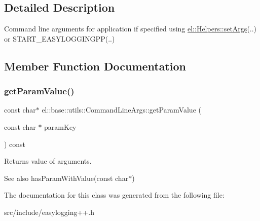\subsection{Detailed Description}
Command line arguments for application if specified using \hyperlink{classel_1_1_helpers_a68748f618a0c2840b96dc12532b09bf0}{el\+::\+Helpers\+::set\+Args}(..) or S\+T\+A\+R\+T\+\_\+\+E\+A\+S\+Y\+L\+O\+G\+G\+I\+N\+G\+PP(..) 

\subsection{Member Function Documentation}
\mbox{\label{classel_1_1base_1_1utils_1_1_command_line_args_ae73303db2f3001842ac094ebd0b28d3f}} 
\subsubsection{\texorpdfstring{get\+Param\+Value()}{getParamValue()}}
{\footnotesize\ttfamily const char$\ast$ el\+::base\+::utils\+::\+Command\+Line\+Args\+::get\+Param\+Value (\begin{DoxyParamCaption}\item[{const char $\ast$}]{param\+Key }\end{DoxyParamCaption}) const\hspace{0.3cm}{\ttfamily [inline]}}



Returns value of arguments. 

\begin{DoxySeeAlso}{See also}
has\+Param\+With\+Value(const char$\ast$) 
\end{DoxySeeAlso}


The documentation for this class was generated from the following file\+:\begin{DoxyCompactItemize}
\item 
src/include/easylogging++.\+h\end{DoxyCompactItemize}
